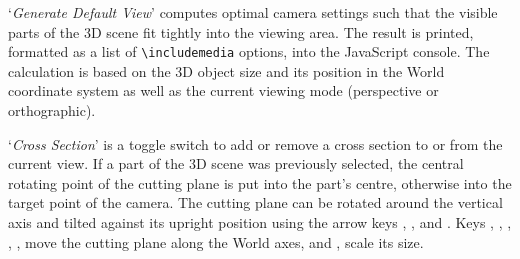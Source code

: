 \documentclass[a4paper]{article}
\begin{document}
`\emph{\sffamily Generate Default View}' computes optimal camera settings such that the visible parts of the 3D scene fit tightly into the viewing area. The result is printed, formatted as a list of \verb+\includemedia+ options, into the JavaScript console. The calculation is based on the 3D object size and its position in the World coordinate system as well as the current viewing mode (perspective or orthographic).

`\emph{\sffamily Cross Section}' is a toggle switch to add or remove a cross section to or from the current view. If a part of the 3D scene was previously selected, the central rotating point of the cutting plane is put into the part's centre, otherwise into the target point of the camera. The cutting plane can be rotated around the vertical axis and tilted against its upright position using the arrow keys \keys{\arrowkeyleft}, \keys{\arrowkeyright}, \keys{\arrowkeyup} and \keys{\arrowkeydown}. Keys , , , , ,  move the cutting plane along the World axes, and ,  scale its size.
\end{document}
